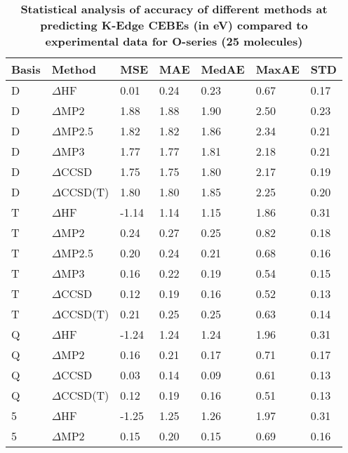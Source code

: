\begin{table}
  \caption{\textbf{Statistical analysis of accuracy of different methods at predicting K-Edge CEBEs (in eV) compared to experimental data for O-series (25 molecules)}}
  \label{tbl:method-summary-o}
  \begin{tabular}{l l l l l l l }
    \hline
    \textbf{Basis} & \textbf{Method} & \textbf{MSE} & \textbf{MAE} & \textbf{MedAE} & \textbf{MaxAE} & \textbf{STD} \\ 
    \hline
    D & $\Delta$HF & 0.01 & 0.24 & 0.23 & 0.67 & 0.17 \\ 
    D & $\Delta$MP2 & 1.88 & 1.88 & 1.90 & 2.50 & 0.23 \\ 
    D & $\Delta$MP2.5 & 1.82 & 1.82 & 1.86 & 2.34 & 0.21 \\ 
    D & $\Delta$MP3 & 1.77 & 1.77 & 1.81 & 2.18 & 0.21 \\ 
    D & $\Delta$CCSD & 1.75 & 1.75 & 1.80 & 2.17 & 0.19 \\ 
    D & $\Delta$CCSD(T) & 1.80 & 1.80 & 1.85 & 2.25 & 0.20 \\ 
    T & $\Delta$HF & -1.14 & 1.14 & 1.15 & 1.86 & 0.31 \\ 
    T & $\Delta$MP2 & 0.24 & 0.27 & 0.25 & 0.82 & 0.18 \\ 
    T & $\Delta$MP2.5 & 0.20 & 0.24 & 0.21 & 0.68 & 0.16 \\ 
    T & $\Delta$MP3 & 0.16 & 0.22 & 0.19 & 0.54 & 0.15 \\ 
    T & $\Delta$CCSD & 0.12 & 0.19 & 0.16 & 0.52 & 0.13 \\ 
    T & $\Delta$CCSD(T) & 0.21 & 0.25 & 0.25 & 0.63 & 0.14 \\ 
    Q & $\Delta$HF & -1.24 & 1.24 & 1.24 & 1.96 & 0.31 \\ 
    Q & $\Delta$MP2 & 0.16 & 0.21 & 0.17 & 0.71 & 0.17 \\ 
    Q & $\Delta$CCSD & 0.03 & 0.14 & 0.09 & 0.61 & 0.13 \\ 
    Q & $\Delta$CCSD(T) & 0.12 & 0.19 & 0.16 & 0.51 & 0.13 \\ 
    5 & $\Delta$HF & -1.25 & 1.25 & 1.26 & 1.97 & 0.31 \\ 
    5 & $\Delta$MP2 & 0.15 & 0.20 & 0.15 & 0.69 & 0.16 \\ 
    \hline
  \end{tabular}
\end{table}
